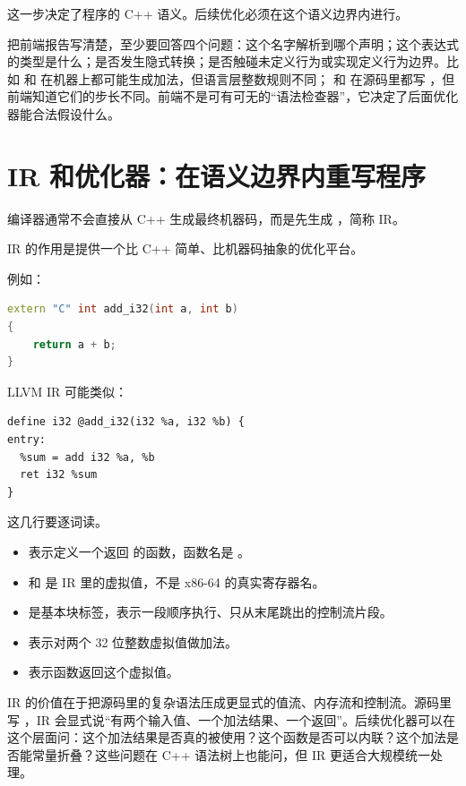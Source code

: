 这一步决定了程序的 C++ 语义。后续优化必须在这个语义边界内进行。

把前端报告写清楚，至少要回答四个问题：这个名字解析到哪个声明；这个表达式的类型是什么；是否发生隐式转换；是否触碰未定义行为或实现定义行为边界。比如  和  在机器上都可能生成加法，但语言层整数规则不同； 和  在源码里都写 ，但前端知道它们的步长不同。前端不是可有可无的“语法检查器”，它决定了后面优化器能合法假设什么。

\section{IR 和优化器：在语义边界内重写程序}

编译器通常不会直接从 C++ 生成最终机器码，而是先生成 ，简称 IR。

IR 的作用是提供一个比 C++ 简单、比机器码抽象的优化平台。

例如：

\begin{lstlisting}[language=C++]
extern "C" int add_i32(int a, int b)
{
    return a + b;
}
\end{lstlisting}

LLVM IR 可能类似：

\begin{lstlisting}[numbers=none,caption={add\_i32 的最小 IR 形态}]
define i32 @add_i32(i32 %a, i32 %b) {
entry:
  %sum = add i32 %a, %b
  ret i32 %sum
}
\end{lstlisting}

这几行要逐词读。

\begin{itemize}
  \item {} 表示定义一个返回  的函数，函数名是 。
  \item {} 和  是 IR 里的虚拟值，不是 x86-64 的真实寄存器名。
  \item {} 是基本块标签，表示一段顺序执行、只从末尾跳出的控制流片段。
  \item {} 表示对两个 32 位整数虚拟值做加法。
  \item {} 表示函数返回这个虚拟值。
\end{itemize}

IR 的价值在于把源码里的复杂语法压成更显式的值流、内存流和控制流。源码里写 ，IR 会显式说“有两个输入值、一个加法结果、一个返回”。后续优化器可以在这个层面问：这个加法结果是否真的被使用？这个函数是否可以内联？这个加法是否能常量折叠？这些问题在 C++ 语法树上也能问，但 IR 更适合大规模统一处理。

